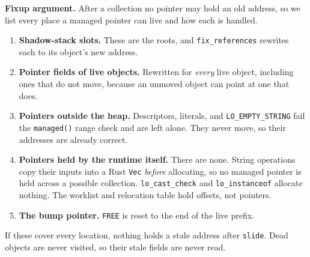 \documentclass[10pt]{article}
\newcommand{\code}[1]{\texttt{\small #1}}
\begin{document}
\begin{center}
\end{center}

\textbf{Fixup argument.} After a collection no pointer may hold an old address, so we list every place a managed pointer can live and how each is handled.
\begin{enumerate}
  \item \textbf{Shadow-stack slots.} These are the roots, and \code{fix\_references} rewrites each to its object's new address.
  \item \textbf{Pointer fields of live objects.} Rewritten for \emph{every} live object, including ones that do not move, because an unmoved object can point at one that does.
  \item \textbf{Pointers outside the heap.} Descriptors, literals, and \code{LO\_EMPTY\_STRING} fail the \code{managed()} range check and are left alone. They never move, so their addresses are already correct.
  \item \textbf{Pointers held by the runtime itself.} There are none. String operations copy their inputs into a Rust \code{Vec} \emph{before} allocating, so no managed pointer is held across a possible collection. \code{lo\_cast\_check} and \code{lo\_instanceof} allocate nothing. The worklist and relocation table hold offsets, not pointers.
  \item \textbf{The bump pointer.} \code{FREE} is reset to the end of the live prefix.
\end{enumerate}
If these cover every location, nothing holds a stale address after \code{slide}. Dead objects are never visited, so their stale fields are never read.
\end{document}
